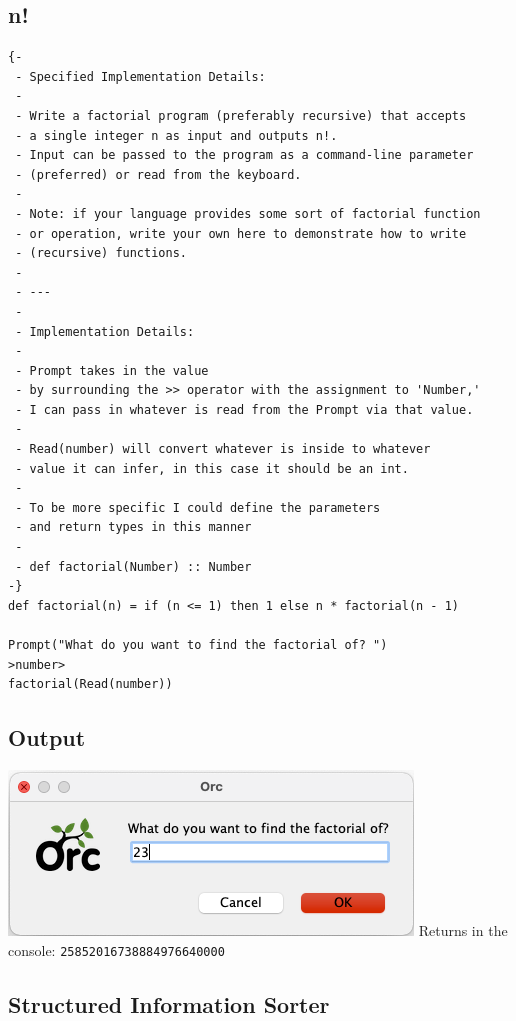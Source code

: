\documentclass[12pt, letterpaper]{article}
\begin{document}
\subsection*{n!}
\begin{lstlisting}
{-
 - Specified Implementation Details:
 -
 - Write a factorial program (preferably recursive) that accepts
 - a single integer n as input and outputs n!.
 - Input can be passed to the program as a command-line parameter
 - (preferred) or read from the keyboard.
 -
 - Note: if your language provides some sort of factorial function
 - or operation, write your own here to demonstrate how to write
 - (recursive) functions.
 -
 - ---
 -
 - Implementation Details:
 -
 - Prompt takes in the value
 - by surrounding the >> operator with the assignment to 'Number,'
 - I can pass in whatever is read from the Prompt via that value.
 -
 - Read(number) will convert whatever is inside to whatever
 - value it can infer, in this case it should be an int.
 -
 - To be more specific I could define the parameters
 - and return types in this manner
 -
 - def factorial(Number) :: Number
-}
def factorial(n) = if (n <= 1) then 1 else n * factorial(n - 1)

Prompt("What do you want to find the factorial of? ")
>number>
factorial(Read(number))
\end{lstlisting}

\subsection*{Output}
\includegraphics{n!-output.png}
Returns in the console: \texttt{25852016738884976640000}

\newpage

\subsection*{Structured Information Sorter}
\end{document}
